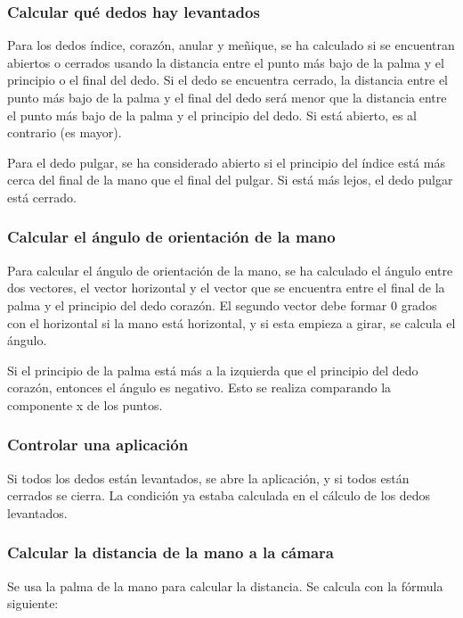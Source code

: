 \documentclass[12pt]{article}
\begin{document}
\subsubsection*{Calcular qué dedos hay levantados}

Para los dedos índice, corazón, anular y meñique, se ha calculado si se encuentran abiertos o cerrados usando la distancia entre el punto más bajo de la palma y el principio o el final del dedo. Si el dedo se encuentra cerrado, la distancia entre el punto más bajo de la palma y el final del dedo será menor que la distancia entre el punto más bajo de la palma y el principio del dedo. Si está abierto, es al contrario (es mayor).

Para el dedo pulgar, se ha considerado abierto si el principio del índice está más cerca del final de la mano que el final del pulgar. Si está más lejos, el dedo pulgar está cerrado.

\subsubsection*{Calcular el ángulo de orientación de la mano}

Para calcular el ángulo de orientación de la mano, se ha calculado el ángulo entre dos vectores, el vector horizontal y el vector que se encuentra entre el final de la palma y el principio del dedo corazón. El segundo vector debe formar 0 grados con el horizontal si la mano está horizontal, y si esta empieza a girar, se calcula el ángulo.

Si el principio de la palma está más a la izquierda que el principio del dedo corazón, entonces el ángulo es negativo. Esto se realiza comparando la componente x de los puntos.

\subsubsection*{Controlar una aplicación}

Si todos los dedos están levantados, se abre la aplicación, y si todos están cerrados se cierra. La condición ya estaba calculada en el cálculo de los dedos levantados.

\subsubsection*{Calcular la distancia de la mano a la cámara}

Se usa la palma de la mano para calcular la distancia. Se calcula con la fórmula siguiente:
\end{document}
